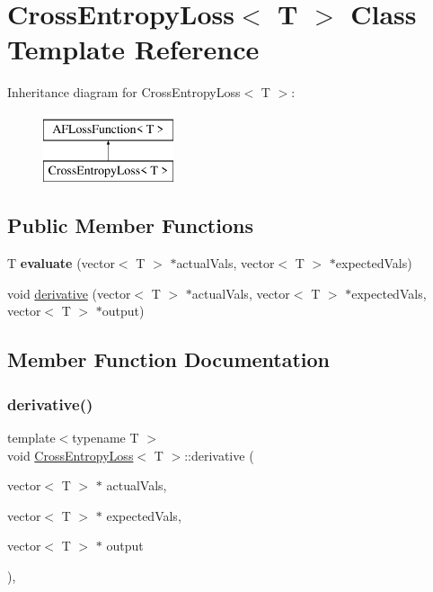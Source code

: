 \hypertarget{classCrossEntropyLoss}{}\section{Cross\+Entropy\+Loss$<$ T $>$ Class Template Reference}
\label{classCrossEntropyLoss}
Inheritance diagram for Cross\+Entropy\+Loss$<$ T $>$\+:\begin{figure}[H]
\begin{center}
\leavevmode
\includegraphics[height=2.000000cm]{classCrossEntropyLoss}
\end{center}
\end{figure}
\subsection*{Public Member Functions}
\begin{DoxyCompactItemize}
\item 
\mbox{\label{classCrossEntropyLoss_a4ee9697f6272e7f94809e69ac85776d1}} 
T {\bfseries evaluate} (vector$<$ T $>$ $\ast$actual\+Vals, vector$<$ T $>$ $\ast$expected\+Vals)
\item 
void \hyperlink{classCrossEntropyLoss_a42d889334750f5a38e74dbce97b4a720}{derivative} (vector$<$ T $>$ $\ast$actual\+Vals, vector$<$ T $>$ $\ast$expected\+Vals, vector$<$ T $>$ $\ast$output)
\end{DoxyCompactItemize}


\subsection{Member Function Documentation}
\mbox{\label{classCrossEntropyLoss_a42d889334750f5a38e74dbce97b4a720}} 
\subsubsection{\texorpdfstring{derivative()}{derivative()}}
{\footnotesize\ttfamily template$<$typename T $>$ \\
void \hyperlink{classCrossEntropyLoss}{Cross\+Entropy\+Loss}$<$ T $>$\+::derivative (\begin{DoxyParamCaption}\item[{vector$<$ T $>$ $\ast$}]{actual\+Vals,  }\item[{vector$<$ T $>$ $\ast$}]{expected\+Vals,  }\item[{vector$<$ T $>$ $\ast$}]{output }\end{DoxyParamCaption})\hspace{0.3cm}{\ttfamily [inline]}, {\ttfamily [virtual]}}

